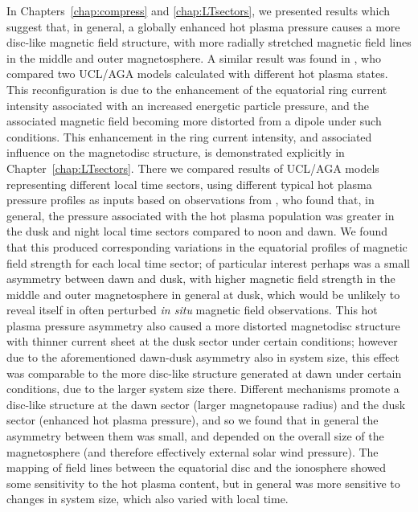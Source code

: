 In Chapters~\ref{chap:compress} and \ref{chap:LTsectors}, we presented results which suggest that, in general, a globally enhanced hot plasma pressure causes a more disc-like magnetic field structure, with more radially stretched magnetic field lines in the middle and outer magnetosphere. A similar result was found in \citet{achilleos2010b}, who compared two UCL/AGA models calculated with different hot plasma states. This reconfiguration is due to the enhancement of the equatorial ring current intensity associated with an increased energetic particle pressure, and the associated magnetic field becoming more distorted from a dipole under such conditions. This enhancement in the ring current intensity, and associated influence on the magnetodisc structure, is demonstrated explicitly in Chapter~\ref{chap:LTsectors}. There we compared results of UCL/AGA models representing different local time sectors, using different typical hot plasma pressure profiles as inputs based on observations from \citet{sergis2017}, who found that, in general, the pressure associated with the hot plasma population was greater in the dusk and night local time sectors compared to noon and dawn. We found that this produced corresponding variations in the equatorial profiles of magnetic field strength for each local time sector; of particular interest perhaps was a small asymmetry between dawn and dusk, with higher magnetic field strength in the middle and outer magnetosphere in general at dusk, which would be unlikely to reveal itself in often perturbed \textit{in situ} magnetic field observations. This hot plasma pressure asymmetry also caused a more distorted magnetodisc structure with thinner current sheet at the dusk sector under certain conditions; however due to the aforementioned dawn-dusk asymmetry also in system size, this effect was comparable to the more disc-like structure generated at dawn under certain conditions, due to the larger system size there. Different mechanisms promote a disc-like structure at the dawn sector (larger magnetopause radius) and the dusk sector (enhanced hot plasma pressure), and so we found that in general the asymmetry between them was small, and depended on the overall size of the magnetosphere (and therefore effectively external solar wind pressure). The mapping of field lines between the equatorial disc and the ionosphere showed some sensitivity to the hot plasma content, but in general was more sensitive to changes in system size, which also varied with local time.

